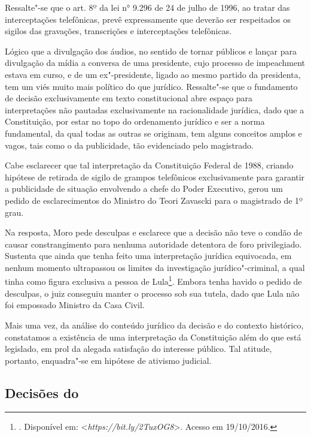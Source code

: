 Ressalte"-se que o art. 8º da lei n° 9.296 de 24 de julho de 1996, ao
tratar das interceptações telefônicas, prevê expressamente que deverão
ser respeitados os sigilos das gravações, transcrições e interceptações
telefônicas.

Lógico que a divulgação dos áudios, no sentido de tornar públicos e
lançar para divulgação da mídia a conversa de uma presidente, cujo
processo de impeachment estava em curso, e de um ex"-presidente, ligado ao
mesmo partido da presidenta, tem um viés muito mais político do que
jurídico. Ressalte"-se que o fundamento de decisão exclusivamente em
texto constitucional abre espaço para interpretações não pautadas exclusivamente na
racionalidade jurídica, dado que a Constituição, por
estar no topo do ordenamento jurídico e ser a norma fundamental, da qual
todas as outras se originam, tem alguns conceitos amplos e vagos, tais
como o da publicidade, tão evidenciado pelo magistrado.

Cabe esclarecer que tal interpretação da Constituição Federal de 1988,
criando hipótese de retirada de sigilo de grampos telefônicos
exclusivamente para garantir a publicidade de situação envolvendo a
chefe do Poder Executivo, gerou um pedido de esclarecimentos do Ministro
do  Teori Zavascki para o magistrado de 1º grau.

Na resposta, Moro pede desculpas e esclarece que a decisão não teve o
condão de causar constrangimento para nenhuma autoridade detentora de
foro privilegiado. Sustenta que ainda que tenha feito uma interpretação
jurídica equivocada, em nenhum momento ultrapassou os limites da
investigação jurídico"-criminal, a qual tinha como figura exclusiva a
pessoa de Lula\footnote{. Disponível em:
  \textless{}\emph{https://bit.ly/2TuxOG8}\textgreater{}.
  Acesso em 19/10/2016.}. Embora tenha havido o pedido de desculpas, o
juiz conseguiu manter o processo sob sua tutela, dado que Lula não foi
empossado Ministro da Casa Civil.

Mais uma vez, da análise do conteúdo jurídico da decisão e do contexto
histórico, constatamos a existência de uma interpretação da Constituição
além do que está legislado, em prol da alegada satisfação do interesse
público. Tal atitude, portanto, enquadra"-se em hipótese de ativismo
judicial.

\subsection{Decisões do }

